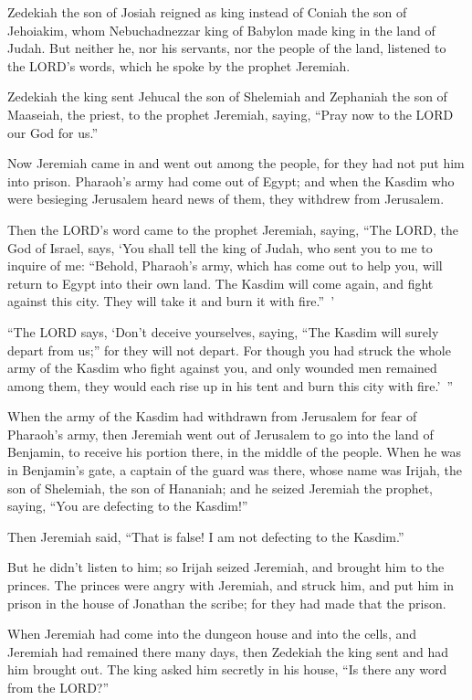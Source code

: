 \mychapter{} \myverse*{}Zedekiah the son of Josiah reigned as king instead of Coniah the son of Jehoiakim, whom Nebuchadnezzar king of Babylon made king in the land of Judah. \myverse{}But neither he, nor his servants, nor the people of the land, listened to the LORD’s words, which he spoke by the prophet Jeremiah.


\myverse{}Zedekiah the king sent Jehucal the son of Shelemiah and Zephaniah the son of Maaseiah, the priest, to the prophet Jeremiah, saying, “Pray now to the LORD our God for us.”


\myverse{}Now Jeremiah came in and went out among the people, for they had not put him into prison. \myverse{}Pharaoh’s army had come out of Egypt; and when the Kasdim who were besieging Jerusalem heard news of them, they withdrew from Jerusalem.


\myverse{}Then the LORD’s word came to the prophet Jeremiah, saying, \myverse{}“The LORD, the God of Israel, says, ‘You shall tell the king of Judah, who sent you to me to inquire of me: “Behold, Pharaoh’s army, which has come out to help you, will return to Egypt into their own land. \myverse{}The Kasdim will come again, and fight against this city. They will take it and burn it with fire.” ’


\myverse{}“The LORD says, ‘Don’t deceive yourselves, saying, “The Kasdim will surely depart from us;” for they will not depart. \myverse{}For though you had struck the whole army of the Kasdim who fight against you, and only wounded men remained among them, they would each rise up in his tent and burn this city with fire.’ ”

\myverse{}When the army of the Kasdim had withdrawn from Jerusalem for fear of Pharaoh’s army, \myverse{}then Jeremiah went out of Jerusalem to go into the land of Benjamin, to receive his portion there, in the middle of the people. \myverse{}When he was in Benjamin’s gate, a captain of the guard was there, whose name was Irijah, the son of Shelemiah, the son of Hananiah; and he seized Jeremiah the prophet, saying, “You are defecting to the Kasdim!”


\myverse{}Then Jeremiah said, “That is false! I am not defecting to the Kasdim.”

But he didn’t listen to him; so Irijah seized Jeremiah, and brought him to the princes. \myverse{}The princes were angry with Jeremiah, and struck him, and put him in prison in the house of Jonathan the scribe; for they had made that the prison.


\myverse{}When Jeremiah had come into the dungeon house and into the cells, and Jeremiah had remained there many days, \myverse{}then Zedekiah the king sent and had him brought out. The king asked him secretly in his house, “Is there any word from the LORD?”

